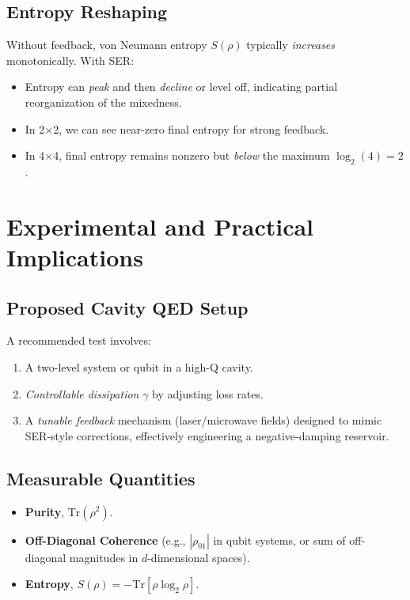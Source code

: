 \documentclass[12pt]{article}
\begin{document}
\subsection{Entropy Reshaping}
Without feedback, von Neumann entropy $S(\rho)$ typically \emph{increases} monotonically. With SER:
\begin{itemize}
\item Entropy can \emph{peak} and then \emph{decline} or level off, indicating partial reorganization of the mixedness.
\item In 2$\times$2, we can see near-zero final entropy for strong feedback.
\item In 4$\times$4, final entropy remains nonzero but \emph{below} the maximum $\log_2(4)=2$.
\end{itemize}

\section{Experimental and Practical Implications}

\subsection{Proposed Cavity QED Setup}
A recommended test involves:
\begin{enumerate}
\item A two-level system or qubit in a high-Q cavity.
\item \emph{Controllable dissipation} $\gamma$ by adjusting loss rates.
\item A \emph{tunable feedback} mechanism (laser/microwave fields) designed to mimic SER-style corrections, effectively engineering a negative-damping reservoir.
\end{enumerate}

\subsection{Measurable Quantities}
\begin{itemize}
\item \textbf{Purity}, $\mathrm{Tr}(\rho^2)$.
\item \textbf{Off-Diagonal Coherence} (e.g., $|\rho_{01}|$ in qubit systems, or sum of off-diagonal magnitudes in $d$-dimensional spaces).
\item \textbf{Entropy}, $S(\rho)=-\mathrm{Tr}[\rho \log_2\rho]$.
\end{itemize}
\end{document}

